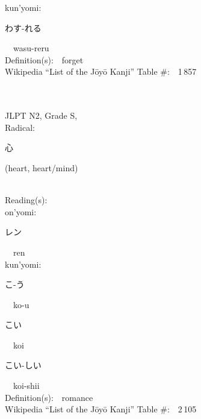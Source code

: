 \begin{multicols}{2}
{\hspace*{1em}}kun'yomi:\ \ \\
{\hspace*{2em}}{\begin{CJK}{UTF8}{min} わす-れる \end{CJK}}\ \ wasu-reru\ \ \\
Definition(s):\ \ forget \\
Wikipedia ``List of the J\=oy\=o Kanji'' Table \#:\ \ 1\,857 \\
\ \ \\
{\fontsize{34pt}{40pt}  }\ \ \\  %
{JLPT N2, Grade S, \\Radical:\ \ {\begin{CJK}{UTF8}{min} 心 \end{CJK}} (heart, heart/mind) } \\
Reading(s):\ \ \\
{\hspace*{1em}}on'yomi:\ \ \\
{\hspace*{2em}}{\begin{CJK}{UTF8}{min} レン \end{CJK}}\ \ ren\ \ \\
{\hspace*{1em}}kun'yomi:\ \ \\
{\hspace*{2em}}{\begin{CJK}{UTF8}{min} こ-う \end{CJK}}\ \ ko-u\ \ \\
{\hspace*{2em}}{\begin{CJK}{UTF8}{min} こい \end{CJK}}\ \ koi\ \ \\
{\hspace*{2em}}{\begin{CJK}{UTF8}{min} こい-しい \end{CJK}}\ \ koi-shii\ \ \\
Definition(s):\ \ romance \\
Wikipedia ``List of the J\=oy\=o Kanji'' Table \#:\ \ 2\,105 \\
\ \ \\
\end{multicols}


